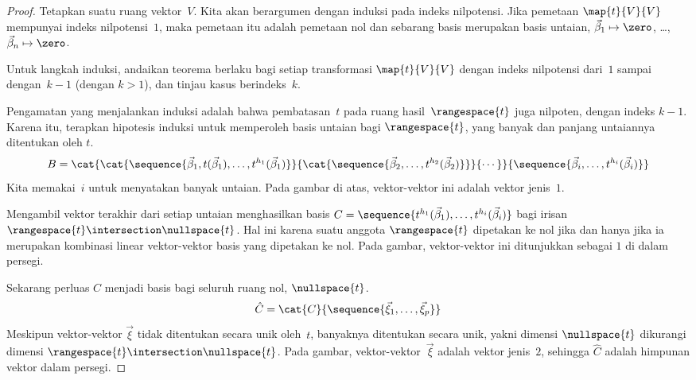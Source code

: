 \begin{proof}
Tetapkan suatu ruang vektor~$V$.
Kita akan berargumen dengan induksi pada indeks nilpotensi.
Jika pemetaan $\map{t}{V}{V}$
mempunyai indeks nilpotensi~\( 1 \), maka pemetaan itu adalah pemetaan nol
dan sebarang basis merupakan basis untaian,
$\vec{\beta}_1\mapsto\zero$, \ldots,
$\vec{\beta}_n\mapsto\zero$.

Untuk langkah induksi, andaikan teorema berlaku bagi setiap transformasi
$\map{t}{V}{V}$
dengan indeks nilpotensi dari~$1$ sampai dengan~\( k-1 \) (dengan $k>1$),
dan tinjau kasus berindeks~$k$.

Pengamatan yang menjalankan induksi adalah bahwa
pembatasan~$t$ pada ruang hasil~\( \rangespace{t} \)
juga nilpoten, dengan indeks \( k-1 \).
Karena itu, terapkan hipotesis induksi untuk memperoleh basis untaian bagi
\( \rangespace{t} \),
yang banyak dan panjang untaiannya ditentukan oleh \( t \).
\begin{equation*}
  B=\cat{\cat{\sequence{\vec{\beta}_1,t(\vec{\beta}_1),\dots,
     t^{h_1}(\vec{\beta}_1)}}{
  \cat{\sequence{\vec{\beta}_2,\ldots,t^{h_2}(\vec{\beta}_2)}}}{\cdots}}{
  \sequence{\vec{\beta}_i,\ldots,t^{h_i}(\vec{\beta}_i)} }
\end{equation*}
Kita memakai~$i$ untuk menyatakan banyak untaian.
Pada gambar di atas, vektor-vektor ini adalah vektor jenis~\( 1 \).

Mengambil vektor terakhir dari setiap untaian
menghasilkan basis
\( C=\sequence{t^{h_1}(\vec{\beta}_1),\dots,t^{h_i}(\vec{\beta}_i)} \)
bagi irisan \( \rangespace{t}\intersection\nullspace{t} \).
Hal ini karena suatu anggota \( \rangespace{t} \) dipetakan ke nol jika dan
hanya jika ia merupakan kombinasi linear vektor-vektor basis yang dipetakan
ke nol.
Pada gambar, vektor-vektor ini ditunjukkan sebagai \( 1 \) di dalam persegi.

Sekarang perluas \( C \) menjadi basis bagi seluruh ruang nol, \( \nullspace{t} \).
\begin{equation*}
  \hat{C}=\cat{C}{\sequence{\vec{\xi}_1,\dots,\vec{\xi}_p}}
\end{equation*}
Meskipun vektor-vektor \( \vec{\xi} \) tidak ditentukan secara unik oleh~$t$,
banyaknya ditentukan secara unik, yakni dimensi
\( \nullspace{t} \) dikurangi dimensi
\( \rangespace{t}\intersection\nullspace{t} \).
Pada gambar, vektor-vektor~$\vec{\xi}$ adalah vektor jenis~\( 2 \),
sehingga \( \hat{C} \) adalah himpunan vektor dalam persegi.


\end{proof}
